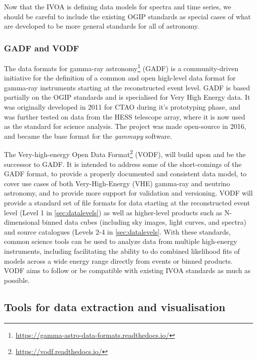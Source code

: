 \documentclass[11pt,a4paper]{ivoa}
\begin{document}
Now that the IVOA is defining data models for spectra and time series, we should be careful to include the existing OGIP standards as special cases of what are developed to be more general standards for all of astronomy.   


\subsubsection{GADF and VODF}
\label{sec:GADF}

The data formats for gamma-ray astronomy\footnote{\url{https://gamma-astro-data-formats.readthedocs.io/}} (GADF) is a community-driven initiative for the definition of a common and open high-level data format for gamma-ray instruments \citep{2017AIPC.1792g0006D,2021-DF} starting at the reconstructed event level. GADF is based partially on the OGIP standards and is specialised for Very High Energy data. It was originally developed in 2011 for CTAO during it's prototyping phase, and was further tested on data from the HESS telescope array, where it is now used as the standard for science analysis. The project was made open-source in 2016, and became the base format for the \emph{gammapy} software.

The Very-high-energy Open Data Format\footnote{\url{https://vodf.readthedocs.io/}} (VODF), will build upon and be the successor to GADF. It is intended to address some of the short-comings of the GADF format, to provide a properly documented and consistent data model, to cover use cases of both  Very-High-Energy (VHE) gamma-ray and neutrino astronomy, and to provide more support for validation and versioning. VODF will provide a standard set of file formats for data starting at the reconstructed event level (Level 1 in \autoref{sec:datalevels}) as well as higher-level products such as N-dimensional binned data cubes (including sky images, light curves, and spectra) and source catalogues (Levels 2-4 in \autoref{sec:datalevels}. With these standards, common science tools can be used to analyze data from multiple high-energy instruments, including facilitating the ability to do combined likelihood fits of models across a wide energy range directly from events or binned products. VODF aims to follow or be compatible with existing IVOA standards as much as possible.

\subsection{Tools for data extraction and visualisation}
\label{sec:tools}
\end{document}
